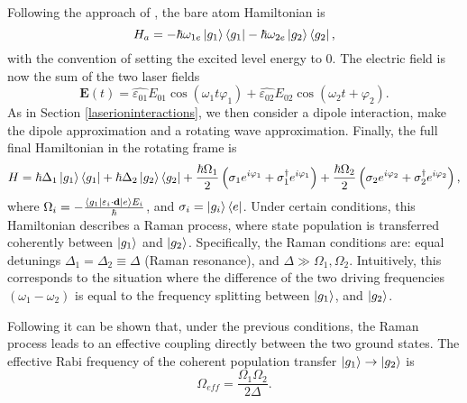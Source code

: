 Following the approach of \cite{steck}, the bare atom Hamiltonian is
\begin{equation}
H_a = -\hbar \omega_{1e}\ket{g_1}\bra{g_1} - \hbar \omega_{2e}\ket{g_2}\bra{g_2},
\end{equation}
with the convention of setting the excited level energy to 0. The electric field is now the sum of the two laser fields
\begin{equation}
\mathbf{E}(t) = \hat{\varepsilon_{01}} E_{01} \cos(\omega_{1} t \varphi_1) + \hat{\varepsilon_{02}} E_{02} \cos(\omega_2 t + \varphi_2).
\end{equation}
As in Section \ref{laserioninteractions}, we then consider a dipole interaction, make the dipole approximation and a rotating wave approximation. Finally, the full final Hamiltonian in the rotating frame is
\begin{equation}
H = \hbar \Delta_1 \ket{g_1}\bra{g_1} + \hbar\Delta_2 \ket{g_2}\bra{g_2}+ \frac{\hbar \Omega_1}{2}\left(\sigma_1 e^{i\varphi_1} +\sigma_1^\dagger e^{i\varphi_1}\right)+ \frac{\hbar \Omega_2}{2}\left(\sigma_2 e^{i\varphi_2} +\sigma_2^\dagger e^{i\varphi_2}\right),
\end{equation}
where $\Omega_i = -\frac{\braket{g_1|\varepsilon_i \cdot \mathbf{d}|e}E_{i}}{\hbar}$, and $\sigma_i = \ket{g_i}\bra{e}$. Under certain conditions, this Hamiltonian describes a Raman process, where state population is transferred coherently between $\ket{g_1}$ and $\ket{g_2}$. Specifically, the Raman conditions are: equal detunings $\Delta_1 = \Delta_2 \equiv \Delta$ (Raman resonance), and $\Delta \gg \Omega_1,\Omega_2$.
Intuitively, this corresponds to the situation where the difference of the two driving frequencies $(\omega_1-\omega_2)$ is equal to the frequency splitting between $\ket{g_1}$, and $\ket{g_2}$.\par
Following \cite{russo} it can be shown that, under the previous conditions, the Raman process leads to an effective coupling directly between the two ground states. The effective Rabi frequency of the coherent population transfer $\ket{g_1} \to \ket{g_2}$ is \cite{steck}
\begin{equation}
\label{eq:effectiverabi}
\Omega_{eff} = \frac{\Omega_1\Omega_2}{2\Delta}.
\end{equation}

